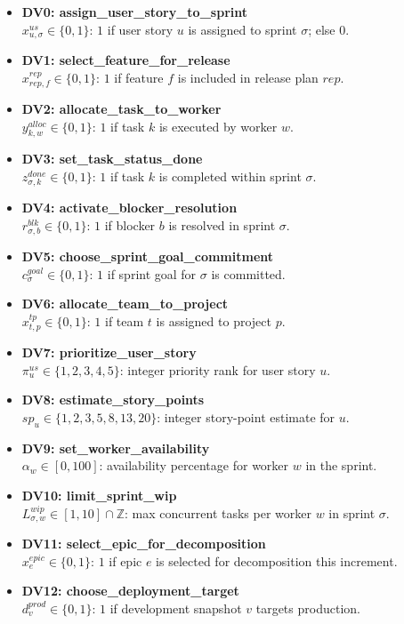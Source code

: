 \documentclass[11pt,a4paper]{article}
\begin{document}
\begin{itemize}[leftmargin=2em]
  \item \textbf{DV0: assign\_user\_story\_to\_sprint} \\
  $x^{us}_{u,\sigma}\in\{0,1\}$: $1$ if user story $u$ is assigned to sprint $\sigma$; else $0$.
  \item \textbf{DV1: select\_feature\_for\_release} \\
  $x^{rep}_{rep,f}\in\{0,1\}$: $1$ if feature $f$ is included in release plan $rep$.
  \item \textbf{DV2: allocate\_task\_to\_worker} \\
  $y^{alloc}_{k,w}\in\{0,1\}$: $1$ if task $k$ is executed by worker $w$.
  \item \textbf{DV3: set\_task\_status\_done} \\
  $z^{done}_{\sigma,k}\in\{0,1\}$: $1$ if task $k$ is completed within sprint $\sigma$.
  \item \textbf{DV4: activate\_blocker\_resolution} \\
  $r^{blk}_{\sigma,b}\in\{0,1\}$: $1$ if blocker $b$ is resolved in sprint $\sigma$.
  \item \textbf{DV5: choose\_sprint\_goal\_commitment} \\
  $c^{goal}_{\sigma}\in\{0,1\}$: $1$ if sprint goal for $\sigma$ is committed.
  \item \textbf{DV6: allocate\_team\_to\_project} \\
  $x^{tp}_{t,p}\in\{0,1\}$: $1$ if team $t$ is assigned to project $p$.
  \item \textbf{DV7: prioritize\_user\_story} \\
  $\pi^{us}_{u}\in\{1,2,3,4,5\}$: integer priority rank for user story $u$.
  \item \textbf{DV8: estimate\_story\_points} \\
  $sp_u\in\{1,2,3,5,8,13,20\}$: integer story-point estimate for $u$.
  \item \textbf{DV9: set\_worker\_availability} \\
  $\alpha_w\in[0,100]$: availability percentage for worker $w$ in the sprint.
  \item \textbf{DV10: limit\_sprint\_wip} \\
  $L^{wip}_{\sigma,w}\in[1,10]\cap\mathbb{Z}$: max concurrent tasks per worker $w$ in sprint $\sigma$.
  \item \textbf{DV11: select\_epic\_for\_decomposition} \\
  $x^{epic}_{e}\in\{0,1\}$: $1$ if epic $e$ is selected for decomposition this increment.
  \item \textbf{DV12: choose\_deployment\_target} \\
  $d^{prod}_{v}\in\{0,1\}$: $1$ if development snapshot $v$ targets production.
\end{itemize}
\end{document}
